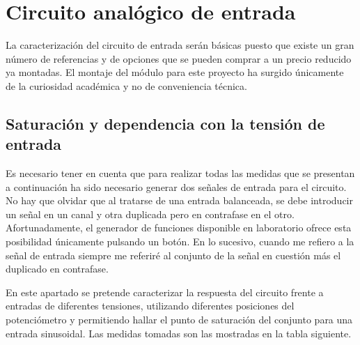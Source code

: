 \section{Circuito analógico de entrada\label{testcircuito}}

La caracterización del circuito de entrada serán básicas puesto que existe un gran número de referencias y de opciones que se pueden comprar a un precio reducido ya montadas. El montaje del módulo para este proyecto ha surgido únicamente de la curiosidad académica y no de conveniencia técnica.

\subsection{Saturación y dependencia con la tensión de entrada}
Es necesario tener en cuenta que para realizar todas las medidas que se presentan a continuación ha sido necesario generar dos señales de entrada para el circuito. No hay que olvidar que al tratarse de una entrada balanceada, se debe introducir un señal en un canal y otra duplicada pero en contrafase en el otro. Afortunadamente, el generador de funciones disponible en laboratorio ofrece esta posibilidad únicamente pulsando un botón. En lo sucesivo, cuando me refiero a la señal de entrada siempre me referiré al conjunto de la señal en cuestión más el duplicado en contrafase.

En este apartado se pretende caracterizar la respuesta del circuito frente a entradas de diferentes tensiones, utilizando diferentes posiciones del potenciómetro y permitiendo hallar el punto de saturación del conjunto para una entrada sinusoidal. Las medidas tomadas son las mostradas en la tabla siguiente.\\

